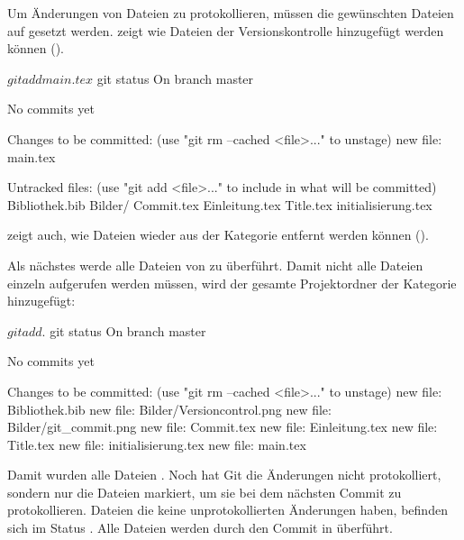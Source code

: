 Um Änderungen von Dateien zu protokollieren, müssen die gewünschten Dateien auf  gesetzt werden.  zeigt wie Dateien der Versionskontrolle hinzugefügt werden können ().
\begin{mplisting}
$ git add main.tex
$ git status
On branch master

No commits yet

Changes to be committed:
  (use "git rm --cached <file>..." to unstage)
	new file:   main.tex

Untracked files:
  (use "git add <file>..." to include in what will be committed)
	Bibliothek.bib
	Bilder/
	Commit.tex
	Einleitung.tex
	Title.tex
	initialisierung.tex
\end{mplisting}
 zeigt auch, wie Dateien wieder aus der  Kategorie entfernt werden können (). 

Als nächstes werde  alle Dateien von  zu  überführt. Damit nicht alle Dateien einzeln aufgerufen werden müssen, wird der gesamte Projektordner der   Kategorie hinzugefügt:
\begin{mplisting}
$ git add .
$ git status
On branch master

No commits yet

Changes to be committed:
  (use "git rm --cached <file>..." to unstage)
	new file:   Bibliothek.bib
	new file:   Bilder/Versioncontrol.png
	new file:   Bilder/git_commit.png
	new file:   Commit.tex
	new file:   Einleitung.tex
	new file:   Title.tex
	new file:   initialisierung.tex
	new file:   main.tex

\end{mplisting}
Damit wurden alle Dateien . Noch hat Git die Änderungen nicht protokolliert, sondern nur die Dateien markiert, um sie bei dem nächsten Commit zu protokollieren. Dateien die keine unprotokollierten Änderungen haben, befinden sich im Status . Alle  Dateien werden durch den Commit in  überführt.